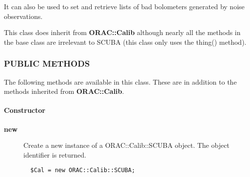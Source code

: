 It can also be used to set and retrieve lists of bad bolometers generated
by noise observations.



This class does inherit from \textbf{ORAC::Calib} although nearly all the
methods in the base class are irrelevant to SCUBA (this class only
uses the thing() method).

\subsubsection*{PUBLIC METHODS\label{ORAC::Calib::SCUBA_PUBLIC_METHODS}}


The following methods are available in this class.
These are in addition to the methods inherited from \textbf{ORAC::Calib}.

\paragraph*{Constructor\label{ORAC::Calib::SCUBA_Constructor}}
\begin{description}

\item[{\textbf{new}}] \mbox{}

Create a new instance of a ORAC::Calib::SCUBA object.
The object identifier is returned.

\begin{verbatim}
  $Cal = new ORAC::Calib::SCUBA;
\end{verbatim}
\end{description}
